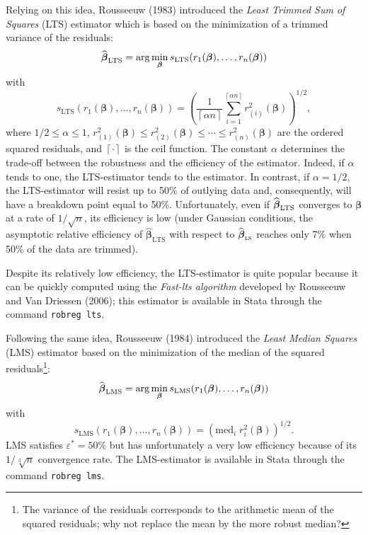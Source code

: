 Relying on this idea, Rousseeuw (1983) introduced the \emph{Least Trimmed
Sum of Squares} (LTS) estimator which is based on the minimization of
a trimmed variance of the residuals:
\[
\sthat{\boldsymbol\beta}_{\mathrm{LTS}}=\arg\min_{\boldsymbol\beta%
}s_{\mathrm{LTS}}\left(  r_{1}(\boldsymbol\beta),\ldots,r_{n}%
(\boldsymbol\beta)\right)
\]
with%
\[
s_{\mathrm{LTS}}\left(  r_{1}(\boldsymbol\beta),\ldots,r_{n}%
(\boldsymbol\beta)\right)  =\left(  \frac{1}{\left\lceil \alpha
n\right\rceil }\sum_{i=1}^{\left\lceil \alpha n\right\rceil }r_{(i)}%
^{2}(\boldsymbol\beta)\right)  ^{1/2},
\]
where $1/2\leq\alpha\leq1$, $r_{(1)}^{2}(\boldsymbol\beta)\leq r_{(2)}%
^{2}(\boldsymbol\beta)\leq\cdots\leq r_{(n)}^{2}(\boldsymbol\beta)$ are
the ordered squared residuals, and $\left\lceil \cdot\right\rceil $ is the
ceil function. The constant $\alpha$ determines the trade-off between the
robustness and the efficiency of the estimator. Indeed, if $\alpha$ tends to
one, the LTS-estimator tends to the  estimator. In contrast, if $\alpha
=1/2$, the LTS-estimator will resist up to 50\% of outlying data and,
consequently, will have a breakdown point equal to 50\%. Unfortunately, even
if $\widehat{\boldsymbol\beta}_{\mathrm{LTS}}$ converges to
$\boldsymbol\beta$ at a rate of $1/\sqrt{n}$, its efficiency is low (under
Gaussian conditions, the asymptotic relative efficiency of $\widehat
{\boldsymbol\beta}_{\mathrm{LTS}}$ with respect to $\widehat
{\boldsymbol\beta}_{\stsc{LS}}$ reaches only 7\% when 50\% of the data are trimmed).

Despite its relatively low efficiency, the LTS-estimator is quite popular
because it can be quickly computed using the \emph{Fast-lts algorithm}
developed by Rousseeuw and Van Driessen (2006); this estimator is available in
Stata through the command \texttt{robreg lts}.

Following the same idea, Rousseeuw (1984) introduced the \emph{Least Median
Squares} (LMS) estimator based on the minimization of the median of
the squared residuals\footnote{The variance of the residuals corresponds to
the arithmetic mean of the squared residuals; why not replace the mean by the
more robust median?}:%
\[
\sthat{\boldsymbol\beta}_{\mathrm{LMS}}=\arg\min_{\boldsymbol\beta%
}s_{\mathrm{LMS}}\left(  r_{1}(\boldsymbol\beta),\ldots,r_{n}%
(\boldsymbol\beta)\right)
\]
with%
\[
s_{\mathrm{LMS}}\left(  r_{1}(\boldsymbol\beta),\ldots,r_{n}%
(\boldsymbol\beta)\right)  =\left(  \mathrm{med}_{i}\;r_{i}^{2}%
(\boldsymbol\beta)\right)  ^{1/2}.
\]
LMS satisfies $\varepsilon^{\ast}=50\%$ but has unfortunately a very low
efficiency because of its $1/\sqrt[3]{n}$ convergence rate. The LMS-estimator
is available in Stata through the command \texttt{robreg lms}.

